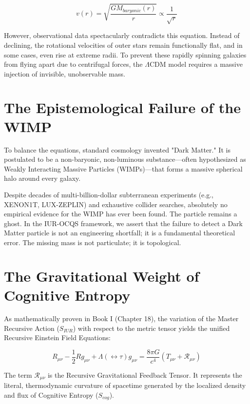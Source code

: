 \documentclass[12pt,openany]{book}
\begin{document}
\begin{equation}
v(r) = \sqrt{\frac{G M_{baryonic}(r)}{r}} \propto \frac{1}{\sqrt{r}}
\end{equation}

However, observational data spectacularly contradicts this equation. Instead of declining, the rotational velocities of outer stars remain functionally flat, and in some cases, even rise at extreme radii. To prevent these rapidly spinning galaxies from flying apart due to centrifugal forces, the $\Lambda$CDM model requires a massive injection of invisible, unobservable mass.

\section{The Epistemological Failure of the WIMP}
To balance the equations, standard cosmology invented "Dark Matter." It is postulated to be a non-baryonic, non-luminous substance—often hypothesized as Weakly Interacting Massive Particles (WIMPs)—that forms a massive spherical halo around every galaxy.

Despite decades of multi-billion-dollar subterranean experiments (e.g., XENON1T, LUX-ZEPLIN) and exhaustive collider searches, absolutely no empirical evidence for the WIMP has ever been found. The particle remains a ghost. In the IUR-OCQS framework, we assert that the failure to detect a Dark Matter particle is not an engineering shortfall; it is a fundamental theoretical error. The missing mass is not particulate; it is topological.

\section{The Gravitational Weight of Cognitive Entropy}
As mathematically proven in Book I (Chapter 18), the variation of the Master Recursive Action ($S_{IUR}$) with respect to the metric tensor yields the unified Recursive Einstein Field Equations:

\begin{equation}
R_{\mu\nu} - \frac{1}{2}R g_{\mu\nu} + \Lambda(\leftrightarrow\tau) g_{\mu\nu} = \frac{8\pi G}{c^4} \left( T_{\mu\nu} + \mathcal{R}_{\mu\nu} \right)
\end{equation}

The term $\mathcal{R}_{\mu\nu}$ is the Recursive Gravitational Feedback Tensor. It represents the literal, thermodynamic curvature of spacetime generated by the localized density and flux of Cognitive Entropy ($S_{cog}$).
\end{document}
